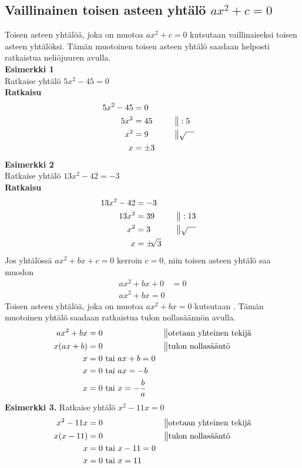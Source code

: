 \subsection*{Vaillinainen toisen asteen yhtälö $ax^2+c=0$} 
    Toisen asteen yhtälöä, joka on muotoa $ax^2+c=0$ kutsutaan vaillinaiseksi toisen asteen yhtälöksi. Tämän muotoinen toisen asteen yhtälö saadaan helposti ratkaistua neliöjuuren avulla.\\
\textbf{Esimerkki 1} \\
Ratkaise yhtälö $5x^2-45=0$ \\
\textbf{Ratkaisu}
\begin{align*}
5x^2-45&=0 \\
5x^2&=45  \ \ \ \ \ &&\big\|:5 \\
x^2&=9 &&\big\| \sqrt{\quad} \\
x&= \pm 3
\end{align*}
\textbf{Esimerkki 2} \\
Ratkaise yhtälö $13x^2-42=-3$ \\
\textbf{Ratkaisu} \\
\begin{align*}
13x^2-42&=-3 \\
13x^2&=39 \ \ \ \ \ &&\big\|:13 \\
x^2&=3 \ \ \ \ \ &&\big\| \sqrt{\quad} \\
x&=\pm \sqrt[]{3}
\end{align*}
Jos yhtälössä $ax^2+bx+c=0$ kerroin $c=0$, niin toisen asteen yhtälö saa muodon
\begin{align*}
ax^2+bx+0&=0 \\
ax^2+bx=0
\end{align*}
Toisen asteen yhtälöä, joka on muotoa $ax^2+bx=0$ kutsutaan . Tämän muotoinen yhtälö saadaan ratkaistua tulon nollasäännön avulla. \\
\begin{align*}
ax^2+bx&=0 \ \ \ \ \ &&\big\|\text{otetaan yhteinen tekijä} \\
x(ax+b)&=0 \ \ \ \ \ &&\big\|\text{tulon nollasääntö} \\
x&=0 \text{ tai } ax+b=0 \\
x&=0 \text{ tai } ax=-b \\
x&=0 \text{ tai } x=-\frac{b}{a}
\end{align*}
\textbf{Esimerkki 3.}
Ratkaise yhtälö $x^2-11x=0$
\begin{align*}
x^2-11x&=0 \ \ \ \ \  &&\big\|\text{otetaan yhteinen tekijä} \\
x(x-11)&=0 \ \ \ \ \ &&\big\|\text{tulon nollasääntö} \\
x&=0 \text{ tai } x-11=0 \\
x&=0 \text{ tai } x=11
\end{align*}
